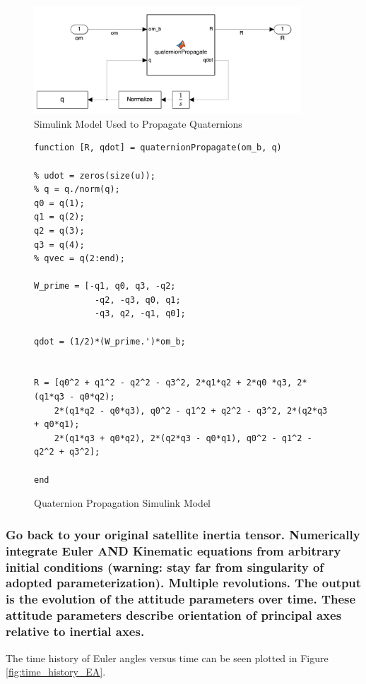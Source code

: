 \begin{figure}[H]
    \centering
    \captionsetup{justification = centering}
    \includegraphics[width = 10cm]{Images/simulink_quat.png}
    \caption{Simulink Model Used to Propagate Quaternions}
    \label{fig:simulink_quats}
\end{figure}

\begin{figure} [H]
    \centering
    \begin{lstlisting}
function [R, qdot] = quaternionPropagate(om_b, q)

% udot = zeros(size(u));
% q = q./norm(q);
q0 = q(1);
q1 = q(2);
q2 = q(3);
q3 = q(4);
% qvec = q(2:end);

W_prime = [-q1, q0, q3, -q2;
            -q2, -q3, q0, q1;
            -q3, q2, -q1, q0];

qdot = (1/2)*(W_prime.')*om_b;


R = [q0^2 + q1^2 - q2^2 - q3^2, 2*q1*q2 + 2*q0 *q3, 2*(q1*q3 - q0*q2);
    2*(q1*q2 - q0*q3), q0^2 - q1^2 + q2^2 - q3^2, 2*(q2*q3 + q0*q1);
    2*(q1*q3 + q0*q2), 2*(q2*q3 - q0*q1), q0^2 - q1^2 - q2^2 + q3^2];

end
    \end{lstlisting}
    \caption{Quaternion Propagation Simulink Model}
    \label{fig:quat_prop_model}
\end{figure}

\subsubsection{Go back to your original satellite inertia tensor. Numerically integrate Euler AND Kinematic equations from arbitrary initial conditions (warning: stay far from singularity of adopted parameterization). Multiple revolutions. The output is the evolution of the attitude parameters over time. These attitude parameters describe orientation of principal axes relative to inertial axes.}

The time history of Euler angles versus time can be seen plotted in  Figure \ref{fig:time_history_EA}.

